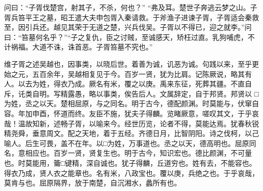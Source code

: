 \documentclass[12pt,UTF8]{ctexbook}
\begin{document}
问曰：“子胥伐楚宫，射其子，不杀，何也？” “弗及耳。楚世子奔逃云梦之山。子胥兵笞平王之墓，昭王遣大夫申包胥入秦请救。于斧渔子进谏子胥，子胥适会秦救至，因引兵还。越见其荣于无道之楚，兴兵伐吴。子胥以不得已，迎之就李。”问曰：“笞墓何名乎？”“子之复仇，臣之讨贼，至诚感天，矫枉过直。乳狗哺虎，不计祸福。大道不诛，诛首恶。子胥笞墓不究也。”

维子胥之述吴越也，因事类，以晓后世。着善为诚，讥恶为诚。句践以来，至乎更始之元，五百余年，吴越相复见于今。百岁一贤，犹为比肩。记陈厥说，略其有人。以去为姓，得衣乃成。厥名有米，覆之以庚。禹来东征，死葬其疆。不直自斥，讬类自明。写精露愚，略以事类，俟告后人。文属辞定，自于邦贤。邦贤以 □为姓，丞之以天。楚相屈原，与之同名。明于古今，德配颜渊。时莫能与，伏窜自容。年加申酉，怀道而终。友臣不施，犹夫子得麟。览睹厥意，嗟叹其文，于乎哀哉！温故知新，述畅子胥，以喻来今。经世历览，论者不得，莫能达焉。犹春秋锐精尧舜，垂意周文。配之天地，着于五经。齐德日月，比智阴阳。诗之伐柯，以己喻人。后生可畏，盖不在年。以□为姓，万事道也。丞之以天，德高明也。屈原同名，意相应也。百岁一贤，贤复生也。明于古今，知识宏也。德比颜渊，不可量也。时莫能用，籥□键精，深自诚也。犹子得麟，丘道穷也。姓有去，不能容也。得衣乃成，贤人衣之能章也。名有米，八政宝也。覆以庚，兵绝之也。于乎哀哉，莫肯与也。屈原隔界，放于南楚，自沉湘水，蠡所有也。

\backmatter
\end{document}
